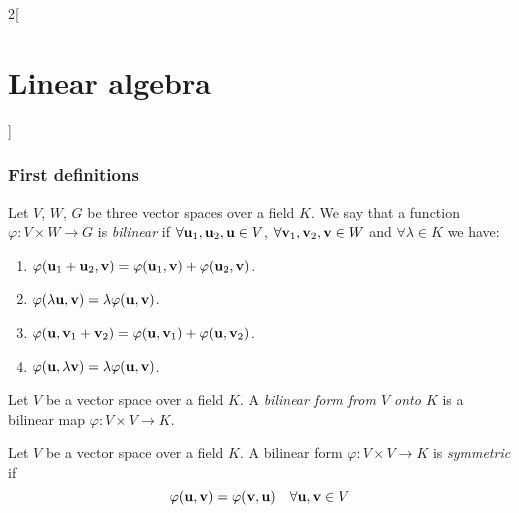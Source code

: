 \documentclass[../../../main.tex]{subfiles}
\begin{document}
\begin{multicols}{2}[\section{Linear algebra}]
  \subsubsection*{First definitions}
  \begin{definition}
    Let $V$, $W$, $G$ be three vector spaces over a field $K$. We say that a function $\varphi:V\times W\rightarrow G$ is \textit{bilinear} if $\forall\vb{u}_1,\vb{u}_2,\vb{u}\in V$, $\forall \vb{v}_1,\vb{v}_2,\vb{v}\in W$ and $\forall\lambda\in K$ we have:
    \begin{enumerate}
      \item $\varphi(\vb{u}_1+\vb{u}_2,\vb{v})=\varphi(\vb{u}_1,\vb{v})+\varphi(\vb{u}_2,\vb{v})$.
      \item $\varphi(\lambda \vb{u},\vb{v})=\lambda \varphi(\vb{u},\vb{v})$.
      \item $\varphi(\vb{u},\vb{v}_1+\vb{v}_2)=\varphi(\vb{u},\vb{v}_1)+\varphi(\vb{u},\vb{v}_2)$.
      \item $\varphi(\vb{u},\lambda \vb{v})=\lambda \varphi(\vb{u},\vb{v})$.
    \end{enumerate}
  \end{definition}
  \begin{definition}
    Let $V$ be a vector space over a field $K$. A \textit{bilinear form from $V$ onto $K$} is a bilinear map $\varphi:V\times V\rightarrow K$.
  \end{definition}
  \begin{definition}
    Let $V$ be a vector space over a field $K$. A bilinear form $\varphi:V\times V\rightarrow K$ is \textit{symmetric} if $$\varphi(\vb{u},\vb{v})=\varphi(\vb{v},\vb{u})\quad\forall \vb{u},\vb{v}\in V$$
  \end{definition}

\end{multicols}
\end{document}
